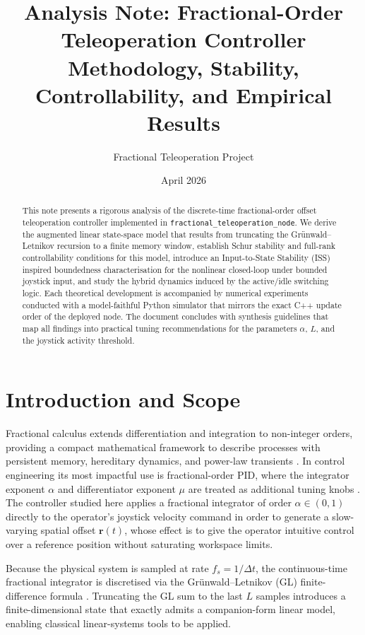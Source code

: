 \documentclass[11pt,a4paper]{article}
\title{\textbf{Analysis Note: Fractional-Order Teleoperation Controller}\\
  \large Methodology, Stability, Controllability, and Empirical Results}
\author{Fractional Teleoperation Project}
\date{April 2026}
\theoremstyle{definition}
\begin{document}
\maketitle
\tableofcontents
\bigskip

\begin{abstract}
This note presents a rigorous analysis of the discrete-time fractional-order
offset teleoperation controller implemented in
\texttt{fractional\_teleoperation\_node}.  We derive the augmented linear
state-space model that results from truncating the Grünwald–Letnikov recursion
to a finite memory window, establish Schur stability and full-rank
controllability conditions for this model, introduce an
Input-to-State Stability (ISS) inspired boundedness characterisation for the
nonlinear closed-loop under bounded joystick input, and study the hybrid
dynamics induced by the active/idle switching logic.  Each theoretical
development is accompanied by numerical experiments conducted with a
model-faithful Python simulator that mirrors the exact C++ update order of
the deployed node.  The document concludes with synthesis guidelines that
map all findings into practical tuning recommendations for the parameters
$\alpha$, $L$, and the joystick activity threshold.
\end{abstract}

\section{Introduction and Scope}
\label{sec:intro}

Fractional calculus extends differentiation and integration to non-integer
orders, providing a compact mathematical framework to describe processes with
persistent memory, hereditary dynamics, and power-law transients
\cite{oldham_spanier_1974,podlubny_1999}.  In control engineering its most
impactful use is fractional-order PID, where the integrator exponent $\alpha$
and differentiator exponent $\mu$ are treated as additional tuning knobs
\cite{monje_2010,oustaloup_2000}.  The controller studied here applies a
fractional integrator of order $\alpha \in (0,1)$ directly to the operator's
joystick velocity command in order to generate a slow-varying spatial offset
$\bm{r}(t)$, whose effect is to give the operator intuitive control over a
reference position without saturating workspace limits.

Because the physical system is sampled at rate $f_s = 1/\Delta t$, the
continuous-time fractional integrator is discretised via the
Grünwald–Letnikov (GL) finite-difference formula \cite{diethelm_2010}.
Truncating the GL sum to the last $L$ samples introduces a finite-dimensional
state that exactly admits a companion-form linear model, enabling classical
linear-systems tools to be applied.
\end{document}
